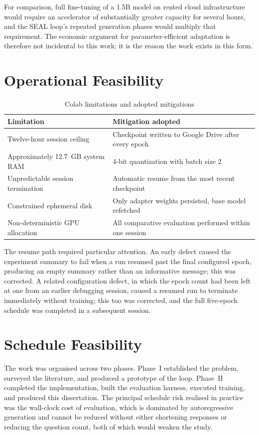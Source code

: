 \documentclass[12pt,a4paper]{report}
\begin{document}
For comparison, full fine-tuning of a 1.5B model on rented cloud infrastructure would require an accelerator of substantially greater capacity for several hours, and the SEAL loop's repeated generation phases would multiply that requirement. The economic argument for parameter-efficient adaptation is therefore not incidental to this work; it is the reason the work exists in this form.

\section{Operational Feasibility}

\begin{table}[htbp]
\centering
\caption{Colab limitations and adopted mitigations}
\begin{tabular}{>{\raggedright\arraybackslash}p{5cm} p{7cm}}
\toprule
\textbf{Limitation} & \textbf{Mitigation adopted} \\
\midrule
Twelve-hour session ceiling & Checkpoint written to Google Drive after every epoch \\
Approximately 12.7~GB system RAM & 4-bit quantization with batch size 2 \\
Unpredictable session termination & Automatic resume from the most recent checkpoint \\
Constrained ephemeral disk & Only adapter weights persisted, base model refetched \\
Non-deterministic GPU allocation & All comparative evaluation performed within one session \\
\bottomrule
\end{tabular}
\end{table}

The resume path required particular attention. An early defect caused the experiment summary to fail when a run resumed past the final configured epoch, producing an empty summary rather than an informative message; this was corrected. A related configuration defect, in which the epoch count had been left at one from an earlier debugging session, caused a resumed run to terminate immediately without training; this too was corrected, and the full five-epoch schedule was completed in a subsequent session.

\section{Schedule Feasibility}

The work was organised across two phases. Phase~I established the problem, surveyed the literature, and produced a prototype of the loop. Phase~II completed the implementation, built the evaluation harness, executed training, and produced this dissertation. The principal schedule risk realised in practice was the wall-clock cost of evaluation, which is dominated by autoregressive generation and cannot be reduced without either shortening responses or reducing the question count, both of which would weaken the study.
\end{document}

